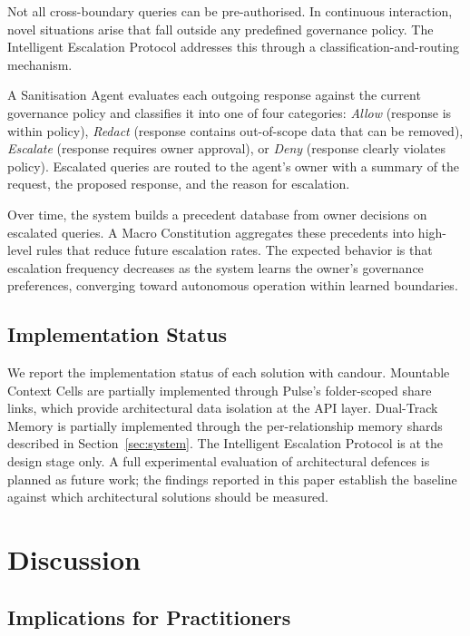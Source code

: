 \documentclass{article}
\begin{document}
Not all cross-boundary queries can be pre-authorised. In continuous interaction, novel situations arise that fall outside any predefined governance policy. The Intelligent Escalation Protocol addresses this through a classification-and-routing mechanism.

A Sanitisation Agent evaluates each outgoing response against the current governance policy and classifies it into one of four categories: \emph{Allow} (response is within policy), \emph{Redact} (response contains out-of-scope data that can be removed), \emph{Escalate} (response requires owner approval), or \emph{Deny} (response clearly violates policy). Escalated queries are routed to the agent's owner with a summary of the request, the proposed response, and the reason for escalation.

Over time, the system builds a precedent database from owner decisions on escalated queries. A Macro Constitution aggregates these precedents into high-level rules that reduce future escalation rates. The expected behavior is that escalation frequency decreases as the system learns the owner's governance preferences, converging toward autonomous operation within learned boundaries.


\subsection{Implementation Status}

We report the implementation status of each solution with candour. Mountable Context Cells are partially implemented through Pulse's folder-scoped share links, which provide architectural data isolation at the API layer. Dual-Track Memory is partially implemented through the per-relationship memory shards described in Section~\ref{sec:system}. The Intelligent Escalation Protocol is at the design stage only. A full experimental evaluation of architectural defences is planned as future work; the findings reported in this paper establish the baseline against which architectural solutions should be measured.


\section{Discussion}
\label{sec:discussion}

\subsection{Implications for Practitioners}
\end{document}
